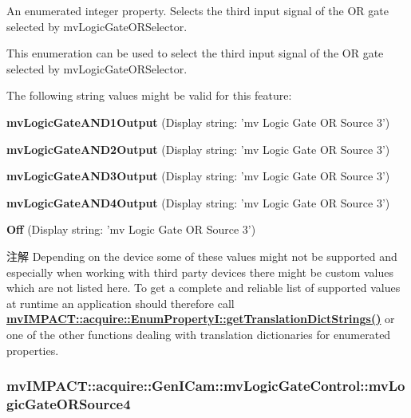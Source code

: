 An enumerated integer property. Selects the third input signal of the O\+R gate selected by mv\+Logic\+Gate\+O\+R\+Selector. 

This enumeration can be used to select the third input signal of the O\+R gate selected by mv\+Logic\+Gate\+O\+R\+Selector.

The following string values might be valid for this feature\+:
\begin{DoxyItemize}
\item {\bfseries mv\+Logic\+Gate\+A\+N\+D1\+Output} (Display string\+: 'mv Logic Gate O\+R Source 3')
\item {\bfseries mv\+Logic\+Gate\+A\+N\+D2\+Output} (Display string\+: 'mv Logic Gate O\+R Source 3')
\item {\bfseries mv\+Logic\+Gate\+A\+N\+D3\+Output} (Display string\+: 'mv Logic Gate O\+R Source 3')
\item {\bfseries mv\+Logic\+Gate\+A\+N\+D4\+Output} (Display string\+: 'mv Logic Gate O\+R Source 3')
\item {\bfseries Off} (Display string\+: 'mv Logic Gate O\+R Source 3')
\end{DoxyItemize}

\begin{DoxyNote}{注解}
Depending on the device some of these values might not be supported and especially when working with third party devices there might be custom values which are not listed here. To get a complete and reliable list of supported values at runtime an application should therefore call {\bfseries \hyperlink{classmv_i_m_p_a_c_t_1_1acquire_1_1_enum_property_i_a0ba6ccbf5ee69784d5d0b537924d26b6}{mv\+I\+M\+P\+A\+C\+T\+::acquire\+::\+Enum\+Property\+I\+::get\+Translation\+Dict\+Strings()}} or one of the other functions dealing with translation dictionaries for enumerated properties. 
\end{DoxyNote}
\hypertarget{classmv_i_m_p_a_c_t_1_1acquire_1_1_gen_i_cam_1_1mv_logic_gate_control_a6a68bd0cd86529ce32ea5c06401c701e}{
\subsubsection[{mv\+Logic\+Gate\+O\+R\+Source4}]{ mv\+I\+M\+P\+A\+C\+T\+::acquire\+::\+Gen\+I\+Cam\+::mv\+Logic\+Gate\+Control\+::mv\+Logic\+Gate\+O\+R\+Source4}}\label{classmv_i_m_p_a_c_t_1_1acquire_1_1_gen_i_cam_1_1mv_logic_gate_control_a6a68bd0cd86529ce32ea5c06401c701e}


